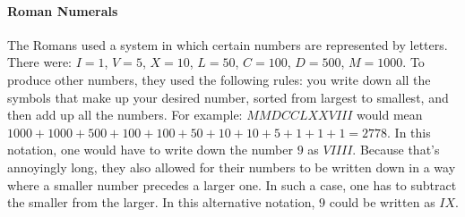 
\paragraph{Roman Numerals}
The Romans used a system in which certain numbers are represented by letters. There were: $I=1$, $V=5$, $X=10$, $L=50$, $C=100$, $D=500$, $M=1000$. To produce other numbers, they used the following rules: you write down all the symbols that make up your desired number, sorted from largest to smallest, and then add up all the numbers. For example: $MMDCCLXXVIII$ would mean $1000+1000+500+100+100+50+10+10+5+1+1+1 = 2778$. In this notation, one would have to write down the number $9$ as $VIIII$. Because that's annoyingly long, they also allowed for their numbers to be written down in a way where a smaller number precedes a larger one. In such a case, one has to subtract the smaller from the larger. In this alternative notation, $9$ could be written as $IX$. %








